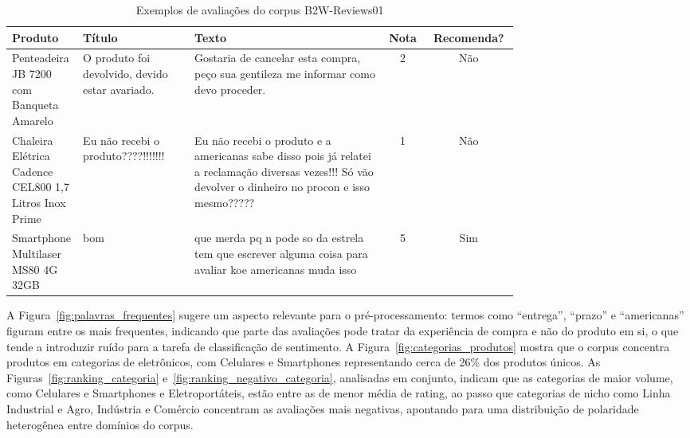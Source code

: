 \documentclass{IEEEtran}
\begin{document}
\begin{table}[htbp]
    \centering
    \caption{Exemplos de avaliações do corpus B2W-Reviews01}
    \label{tab:exemplos}
    \renewcommand{\arraystretch}{1.4}
    \begin{tabular}{p{0.14\linewidth} p{0.22\linewidth} p{0.38\linewidth} c c}
    \toprule
    \textbf{Produto} & \textbf{Título} & \textbf{Texto} & \textbf{Nota} & \textbf{Recomenda?} \\
    \midrule
    
    Penteadeira JB 7200 com Banqueta Amarelo &
    O produto foi devolvido, devido estar avariado. &
    Gostaria de cancelar esta compra, peço sua gentileza me informar como devo proceder. &
    2 & Não \\
    
    \midrule
    
    Chaleira Elétrica Cadence CEL800 1,7 Litros Inox Prime &
    Eu não recebi o produto????!!!!!!!  &
    Eu não recebi o produto e a americanas sabe disso pois já relatei a reclamação diversas vezes!!! Só vão devolver o dinheiro no procon e isso mesmo????? &
    1 & Não \\
    
    \midrule
    
    Smartphone Multilaser MS80 4G 32GB &
    bom &
    que merda pq n pode so da estrela tem que escrever alguma coisa para avaliar koe americanas muda isso &
    5 & Sim \\
    
    \bottomrule
    \end{tabular}
\end{table}

A Figura~\ref{fig:palavras_frequentes} sugere um aspecto relevante para o pré-processamento: termos como ``entrega'', ``prazo'' e ``americanas'' figuram entre os mais frequentes, indicando que parte das avaliações pode tratar da experiência de compra e não do produto em si, o que tende a introduzir ruído para a tarefa de classificação de sentimento. A Figura~\ref{fig:categorias_produtos} mostra que o corpus concentra produtos em categorias de eletrônicos, com Celulares e Smartphones representando cerca de 26\% dos produtos únicos. As Figuras~\ref{fig:ranking_categoria} e~\ref{fig:ranking_negativo_categoria}, analisadas em conjunto, indicam que as categorias de maior volume, como Celulares e Smartphones e Eletroportáteis, estão entre as de menor média de rating, ao passo que categorias de nicho como Linha Industrial e Agro, Indústria e Comércio concentram as avaliações mais negativas, apontando para uma distribuição de polaridade heterogênea entre domínios do corpus.
\end{document}
